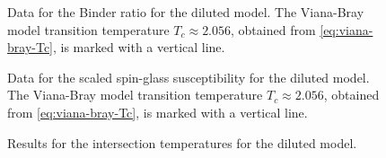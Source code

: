 \begin{figure}
  \centering
  \begin{subfigure}{0.49\textwidth}
    \centering
    
  \end{subfigure}
  \begin{subfigure}{0.49\textwidth}
    \centering
    
  \end{subfigure}
  \caption[
    Data for the Binder ratio for the one-dimensional undiluted spin glass.
  ]
  {
    Data for the Binder ratio for the diluted model. The Viana-Bray model
    transition temperature $T_c \approx 2.056$, obtained from
    \cref{eq:viana-bray-Tc}, is marked with a vertical line.
  }
  \label{fig:binder-d}
\end{figure}

\begin{figure}
  \centering
  \begin{subfigure}{0.49\textwidth}
    \centering
    
  \end{subfigure}
  \begin{subfigure}{0.49\textwidth}
    \centering
    
  \end{subfigure}
  \caption[
    Data for the Binder ratio and the scaled spin-glass susceptibility for the
    one-dimensional diluted spin glass with $\sigma=0$ and $\sigma=0.25$.
  ]
  {
    Data for the scaled spin-glass susceptibility for the diluted model. The
    Viana-Bray model transition temperature $T_c \approx 2.056$, obtained from
    \cref{eq:viana-bray-Tc}, is marked with a vertical line.
  }
  \label{fig:chi-d}
\end{figure}

\begin{figure}
  \centering
  \begin{subfigure}{0.49\textwidth}
    \centering
    
  \end{subfigure}
  \begin{subfigure}{0.49\textwidth}
    \centering
    
  \end{subfigure}
  \caption[
    Results for the intersection temperatures for the one-dimensional diluted
    model with $\sigma=0$ (VB model) and $\sigma=0.25$.
  ]
  {
    Results for the intersection temperatures for the diluted model.
  }
  \label{fig:Tx-d}
\end{figure}

